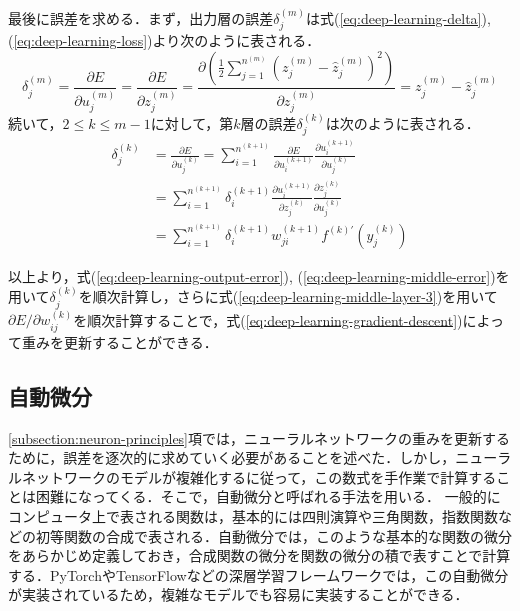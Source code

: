 最後に誤差を求める．まず，出力層の誤差$\delta_j^{(m)}$は式(\ref{eq:deep-learning-delta}), (\ref{eq:deep-learning-loss})より次のように表される．
\begin{equation}
  \delta_j^{(m)} = \frac{\partial E}{\partial u_j^{(m)}} =
  \frac{\partial E}{\partial z_j^{(m)}} =
  \frac{\partial \left( \frac{1}{2} \sum_{j=1}^{n^{(m)}} \left( z_j^{(m)} - \hat{z}_j^{(m)} \right)^2 \right)} {\partial z_j^{(m)}} =
  z_j^{(m)} - \hat{z}_j^{(m)}
  \label{eq:deep-learning-output-error}
\end{equation}
続いて，$2 \leq k \leq m-1$に対して，第$k$層の誤差$\delta_j^{(k)}$は次のように表される．
\begin{equation}
  \begin{split}
  \delta_j^{(k)} &= \frac{\partial E}{\partial u_j^{(k)}} =
  \sum_{i=1}^{n^{(k+1)}} \frac{\partial E}{\partial u_i^{(k+1)}} \frac{\partial u_i^{(k+1)}} {\partial u_j^{(k)}} \\ &=
  \sum_{i=1}^{n^{(k+1)}} \delta_i^{(k+1)} \frac{\partial u_i^{(k+1)}} {\partial z_j^{(k)}} \frac{\partial z_j^{(k)}} {\partial u_j^{(k)}} \\ &=
  \sum_{i=1}^{n^{(k+1)}} \delta_i^{(k+1)} w_{ji}^{(k+1)} f^{(k)\prime}(y_j^{(k)})
  \end{split}
  \label{eq:deep-learning-middle-error}
\end{equation}

以上より，式(\ref{eq:deep-learning-output-error}), (\ref{eq:deep-learning-middle-error})を用いて$\delta_j^{(k)}$を順次計算し，さらに式(\ref{eq:deep-learning-middle-layer-3})を用いて$\partial E / \partial w_{ij}^{(k)}$を順次計算することで，式(\ref{eq:deep-learning-gradient-descent})によって重みを更新することができる．

\subsection{自動微分 \label{subsection:automatic-differentiation}}
\ref{subsection:neuron-principles}項では，ニューラルネットワークの重みを更新するために，誤差を逐次的に求めていく必要があることを述べた．しかし，ニューラルネットワークのモデルが複雑化するに従って，この数式を手作業で計算することは困難になってくる．そこで，自動微分と呼ばれる手法を用いる．
一般的にコンピュータ上で表される関数は，基本的には四則演算や三角関数，指数関数などの初等関数の合成で表される\cite{10.5555/3122009.3242010}．自動微分では，このような基本的な関数の微分をあらかじめ定義しておき，合成関数の微分を関数の微分の積で表すことで計算する\cite{10.5555/3122009.3242010}．PyTorch\cite{NEURIPS2019-9015}やTensorFlow\cite{tensorflow2015-whitepaper}などの深層学習フレームワークでは，この自動微分が実装されているため，複雑なモデルでも容易に実装することができる．

